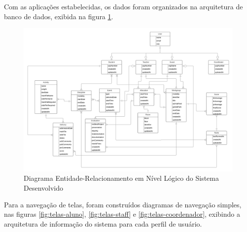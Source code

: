 Com as aplicações estabelecidas, os dados foram organizados na arquitetura de banco de dados, exibida na figura \ref{fig:erd}.

\begin{figure}[!htpb]
    \centering
    \includegraphics[angle=90, origin=c, scale=0.65]{imagens/erd.png}
    \caption{Diagrama Entidade-Relacionamento em Nível Lógico do Sistema Desenvolvido}
    \label{fig:erd}
\end{figure}

Para a navegação de telas, foram construídos diagramas de navegação simples, nas figuras \ref{fig:telas-aluno}, \ref{fig:telas-staff} e \ref{fig:telas-coordenador}, exibindo a arquitetura de informação do sistema para cada perfil de usuário.

